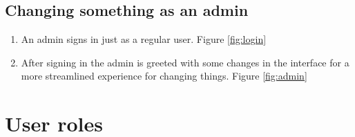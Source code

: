 \documentclass[paper=a4, fontsize=11pt]{report} %
\begin{document}
	\subsection*{Changing something as an admin}
	\begin{enumerate}
		\item An admin signs in just as a regular user. Figure \ref{fig:login}
		\item After signing in the admin is greeted with some changes in the interface for a more streamlined experience for changing things. Figure \ref{fig:admin}
	\end{enumerate}



\section*{User roles}

%
\end{document}
